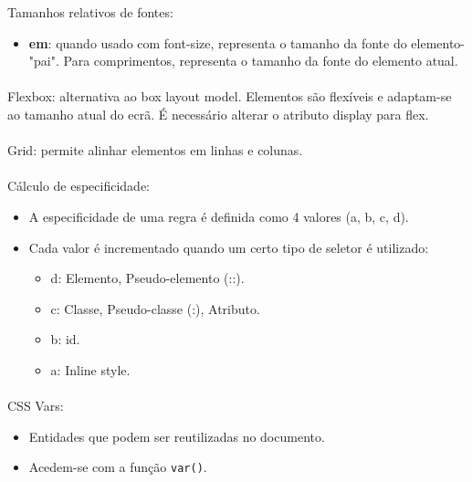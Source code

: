 \documentclass[../resumosLTW.tex]{subfiles}
\begin{document}
Tamanhos relativos de fontes:
\begin{itemize}
    \item \textbf{em}: quando usado com font-size, representa o tamanho da fonte do elemento-"pai". Para comprimentos, representa o tamanho da fonte do elemento atual.
\end{itemize}

\paragraph{}

Flexbox: alternativa ao box layout model. Elementos são flexíveis e adaptam-se ao tamanho atual do ecrã. É necessário alterar o atributo display para flex.

\paragraph{}

Grid: permite alinhar elementos em linhas e colunas.

\paragraph{}

Cálculo de especificidade: 
\begin{itemize}
    \item A especificidade de uma regra é definida como 4 valores (a, b, c, d).
    \item Cada valor é incrementado quando um certo tipo de seletor é utilizado:
    \begin{itemize}
        \item d: Elemento, Pseudo-elemento (::).
        \item c: Classe, Pseudo-classe (:), Atributo.
        \item b: id.
        \item a: Inline style.
    \end{itemize}
\end{itemize}

\paragraph{}

CSS Vars:
\begin{itemize}
    \item Entidades que podem ser reutilizadas no documento.
    \item Acedem-se com a função \lstinline{var()}.
\end{itemize}
\end{document}
